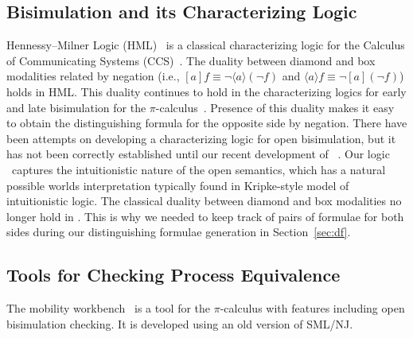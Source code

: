 \subsection{Bisimulation and its Characterizing Logic}
\label{sec:relwork:logic}
Hennessy--Milner Logic (HML)~\cite{HenMil80hml} is a classical
characterizing logic for the Calculus of Communicating Systems (CCS)~\cite{Mil82ccs}.
The duality between diamond and box modalities related by negation 
(i.e., $[a]f \equiv \neg\langle a\rangle(\neg f)$ and $\langle a\rangle f \equiv \neg[a](\neg f)$)
holds in HML. This duality continues to hold in the characterizing logics for
early and late bisimulation for the $\pi$-calculus~\cite{MilParWal93lm}.
Presence of this duality makes it easy to obtain the distinguishing formula
for the opposite side by negation.
There have been attempts \cite{TiuMil10,ParBorEriGutWeb15} on developing
a characterizing logic for open bisimulation, but it has not been correctly
established until our recent development of \OM~\cite{AhnHorTiu17corr}.
Our logic \OM\ captures the intuitionistic nature of the open semantics, which
has a natural possible worlds interpretation typically found in Kripke-style model
of intuitionistic logic. The classical duality between diamond and box modalities
no longer hold in \OM. This is why we needed to keep track of pairs of formulae
for both sides %
during our distinguishing formulae generation in Section~\ref{sec:df}.%
\vspace*{-1ex}
\subsection{Tools for Checking Process Equivalence}
\label{sec:relwork:tools}
The mobility workbench~\cite{VicMol94mwb} is a tool for the $\pi$-calculus
with features including open bisimulation checking. It is developed using
an old version of SML/NJ.


